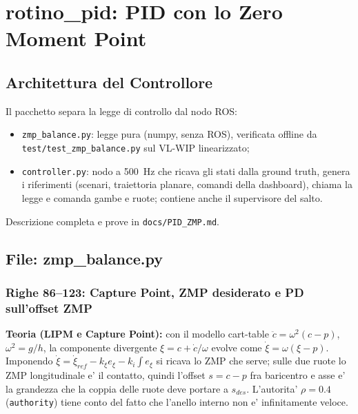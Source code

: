\documentclass[11pt,a4paper]{report}
\begin{document}
\chapter{rotino\_pid: PID con lo Zero Moment Point}

\section{Architettura del Controllore}
Il pacchetto separa la legge di controllo dal nodo ROS:
\begin{itemize}
    \item \texttt{zmp\_balance.py}: legge pura (numpy, senza ROS), verificata offline da
          \texttt{test/test\_zmp\_balance.py} sul VL-WIP linearizzato;
    \item \texttt{controller.py}: nodo a 500~Hz che ricava gli stati dalla ground truth,
          genera i riferimenti (scenari, traiettoria planare, comandi della dashboard),
          chiama la legge e comanda gambe e ruote; contiene anche il supervisore del salto.
\end{itemize}
Descrizione completa e prove in \texttt{docs/PID\_ZMP.md}.

\section{File: zmp\_balance.py}

\subsection{Righe 86--123: Capture Point, ZMP desiderato e PD sull'offset ZMP}

\begin{theoryframe}
\textbf{Teoria (LIPM e Capture Point):} con il modello cart-table
$\ddot c = \omega^2(c - p)$, $\omega^2 = g/h$, la componente divergente
$\xi = c + \dot c/\omega$ evolve come $\dot\xi = \omega(\xi - p)$. Imponendo
$\dot\xi = \dot\xi_{ref} - k_\xi e_\xi - k_i\int e_\xi$ si ricava lo ZMP che serve;
sulle due ruote lo ZMP longitudinale e' il contatto, quindi l'offset $s = c - p$
fra baricentro e asse e' la grandezza che la coppia delle ruote deve portare a
$s_{des}$. L'autorita' $\rho = 0.4$ (\texttt{authority}) tiene conto del fatto che
l'anello interno non e' infinitamente veloce.
\end{theoryframe}
\end{document}
